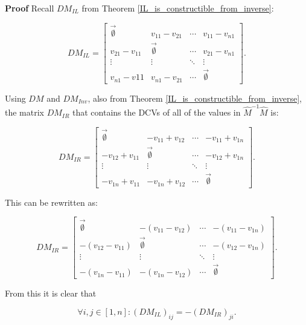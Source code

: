 \documentclass[10pt,letterpaper]{article}
\newenvironment{proof}{\noindent\textbf{Proof} }{\qed \newline}
\newcommand{\qed}{\nobreak \ifvmode \relax \else
      \ifdim\lastskip<1.5em \hskip-\lastskip
      \hskip1.5em plus0em minus0.5em \fi \nobreak
      \vrule height0.75em width0.5em depth0.25em\fi}
\numberwithin{equation}{section}
\begin{document}
\begin{proof}Recall $DM_{IL}$ from Theorem \ref{IL_is_constructible_from_inverse}:

\[ DM_{IL} = \left[ \begin{matrix} 
  \vec{\emptyset} & v_{11} - v_{21} & \cdots & v_{11} - v_{n1} \\
  v_{21} - v_{11} & \vec{\emptyset} & \cdots & v_{21} - v_{n1} \\
  \vdots & \vdots & \ddots & \vdots \\
  v_{n1} - v{11} & v_{n1} - v_{21} & \cdots & \vec{\emptyset}
 \end{matrix} \right]. \]

Using $DM$ and $DM_{Inv}$, also from Theorem
\ref{IL_is_constructible_from_inverse}, the matrix $DM_{IR}$ that
contains the DCVs of all of the values in $\hat M^{-1} \hat M$ is:

\[ DM_{IR} = \left[ \begin{matrix} 
  \vec{\emptyset} & -v_{11} + v_{12} & \cdots & -v_{11} + v_{1n} \\
  -v_{12} + v_{11} & \vec{\emptyset} & \cdots & -v_{12} + v_{1n} \\
  \vdots & \vdots & \ddots & \vdots \\
  -v_{1n} + v_{11} & -v_{1n} + v_{12} & \cdots & \vec{\emptyset}
 \end{matrix} \right]. \]

This can be rewritten as:

\[ DM_{IR} = \left[ \begin{matrix} 
  \vec{\emptyset} & -(v_{11} - v_{12}) & \cdots & -(v_{11} - v_{1n}) \\
  -(v_{12} - v_{11}) & \vec{\emptyset} & \cdots & -(v_{12} - v_{1n}) \\
  \vdots & \vdots & \ddots & \vdots \\
  -(v_{1n} - v_{11}) & -(v_{1n} - v_{12}) & \cdots & \vec{\emptyset}
 \end{matrix} \right]. \]

From this it is clear that

\[ \forall i,j \in [1, n] : (DM_{IL})_{ij} = -(DM_{IR})_{ji}. \] \end{proof}
\end{document}
